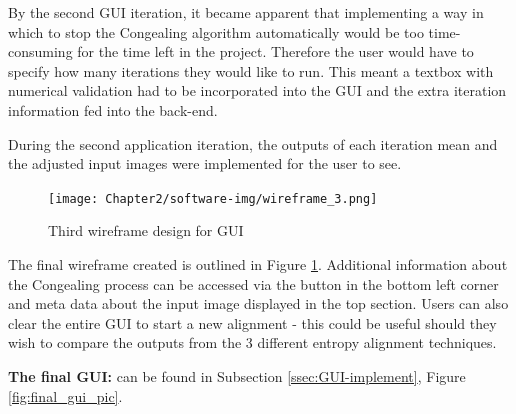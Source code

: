 By the second \acrshort{GUI} iteration, it became apparent that implementing a way in which to stop the \Gls{Congealing} algorithm automatically would be too time-consuming for the time left in the project. Therefore the user would have to specify how many iterations they would like to run. This meant a textbox with numerical validation had to be incorporated into the \acrshort{GUI} and the extra iteration information fed into the back-end.

During the second application iteration, the outputs of each iteration mean and the adjusted input images were implemented for the user to see.

\begin{figure}[H]
  \center
  \texttt{[image: Chapter2/software-img/wireframe\_3.png]}
  \caption{Third wireframe design for GUI}
  \label{fig:wireframe3}
\end{figure}

The final wireframe created is outlined in Figure \ref{fig:wireframe3}. Additional information  about the \Gls{Congealing} process can be accessed via the button in the bottom left corner and meta data about the input image displayed in the top section. Users can also clear the entire \acrshort{GUI} to start a new alignment - this could be useful should they wish to compare the outputs from the 3 different entropy alignment techniques.

\noindent \textbf{The final \acrshort{GUI}:} can be found in Subsection \ref{ssec:GUI-implement}, Figure \ref{fig:final_gui_pic}.
